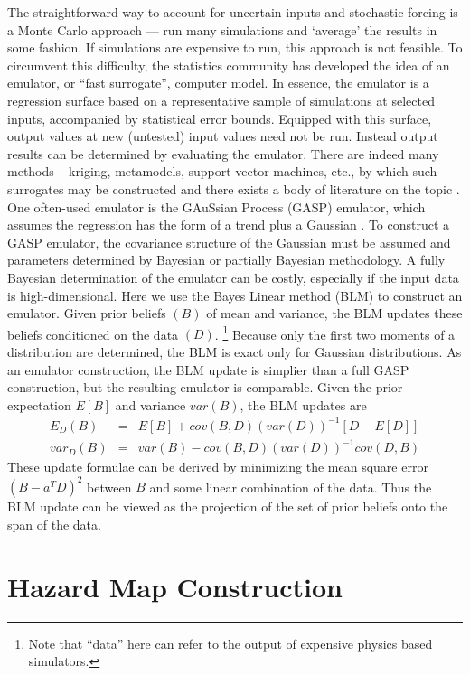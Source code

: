 \documentclass[a4paper,fleqn]{article}
\begin{document}
The straightforward way to account for uncertain inputs and stochastic
forcing is a Monte Carlo approach --- run many simulations and
`average' the results in some fashion. If simulations are expensive to
run, this approach is not feasible. To circumvent this difficulty, the
statistics community has developed the idea of an emulator, or ``fast
surrogate'', computer model.  In essence, the emulator is a regression
surface based on a representative sample of simulations at selected
inputs, accompanied by statistical error bounds. Equipped with this
surface, output values at new (untested) input values need not be run.
Instead output results can be determined by evaluating the
emulator. There are indeed many methods -- kriging, metamodels,
support vector machines, etc., by which such surrogates may be
constructed and there exists a body of literature on the topic
\citep{simpson1,simpson2}.
One often-used emulator is the GAuSsian Process (GASP) emulator, which
assumes the regression has the form of a trend plus a Gaussian
\citep{kennedy2001bcc,ContiOHagan,ohagan2006bac,bayarriusc}.  To
construct a GASP emulator, the covariance structure of the Gaussian
must be assumed and parameters determined by Bayesian or partially
Bayesian methodology.  A fully Bayesian determination of the emulator
can be costly, especially if the input data is high-dimensional.  Here
we use the Bayes Linear method (BLM) \citep{blm1tutor} to construct an
emulator. Given prior beliefs $(B)$ of mean and variance, the BLM
updates these beliefs conditioned on the data $(D)$. \footnote{Note
that ``data'' here can refer to the output of expensive physics based
simulators.} Because only the first two moments of a distribution are
determined, the BLM is exact only for Gaussian distributions.  As an
emulator construction, the BLM update is simplier than a full GASP
construction, but the resulting emulator is comparable.  Given the
prior expectation $E[B]$ and variance $var(B)$, the BLM updates are
\begin{eqnarray} \label{blupdate}
E_D(B) &=& E[B] + cov(B,D) (var(D))^{-1} [D-E[D]] \\ \nonumber
var_D(B) &=& var(B) - cov(B,D) (var(D))^{-1} cov(D,B)
\end{eqnarray}
These update formulae can be derived by minimizing the mean square
error $(B - a^T D)^2$ between $B$ and some linear combination of the
data. Thus the BLM update can be viewed as the projection of the set
of prior beliefs onto the span of the data.


\section{Hazard Map Construction}
\end{document}
